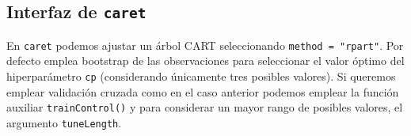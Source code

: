 \documentclass[
]{book}
\newenvironment{Shaded}{\begin{snugshade}}{\end{snugshade}}
\newcommand{\AttributeTok}[1]{\textcolor[rgb]{0.77,0.63,0.00}{#1}}
\newcommand{\CommentTok}[1]{\textcolor[rgb]{0.56,0.35,0.01}{\textit{#1}}}
\newcommand{\DecValTok}[1]{\textcolor[rgb]{0.00,0.00,0.81}{#1}}
\newcommand{\FunctionTok}[1]{\textcolor[rgb]{0.00,0.00,0.00}{#1}}
\newcommand{\NormalTok}[1]{#1}
\newcommand{\OtherTok}[1]{\textcolor[rgb]{0.56,0.35,0.01}{#1}}
\newcommand{\SpecialCharTok}[1]{\textcolor[rgb]{0.00,0.00,0.00}{#1}}
\newcommand{\StringTok}[1]{\textcolor[rgb]{0.31,0.60,0.02}{#1}}
\theoremstyle{break}
\theoremstyle{definition}
\theoremstyle{definition}
\theoremstyle{definition}
\theoremstyle{definition}
\theoremstyle{remark}
\begin{document}
\hypertarget{interfaz-de-caret}{%
\subsection{\texorpdfstring{Interfaz de \texttt{caret}}{Interfaz de caret}}\label{interfaz-de-caret}}

En \texttt{caret} podemos ajustar un árbol CART seleccionando \texttt{method\ =\ "rpart"}.
Por defecto emplea bootstrap de las observaciones para seleccionar el valor óptimo del hiperparámetro \texttt{cp} (considerando únicamente tres posibles valores).
Si queremos emplear validación cruzada como en el caso anterior podemos emplear la función auxiliar \texttt{trainControl()} y para considerar un mayor rango de posibles valores, el argumento \texttt{tuneLength}.

\begin{Shaded}
\end{Shaded}
\end{document}

